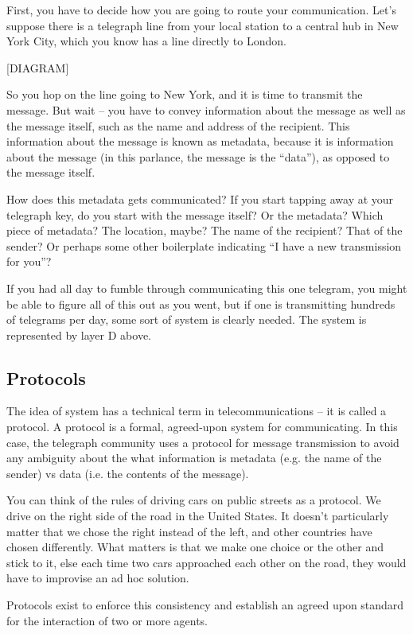 \documentclass{book}
\begin{document}
First, you have to decide how you are going to route your communication. Let's suppose there is a telegraph line from your local station to a central hub in New York City, which you know has a line directly to London.

[DIAGRAM]

So you hop on the line going to New York, and it is time to transmit the message. But wait – you have to convey information about the message as well as the message itself, such as the name and address of the recipient. This information about the message is known as metadata, because it is information about the message (in this parlance, the message is the “data”), as opposed to the message itself.

How does this metadata gets communicated? If you start tapping away at your telegraph key, do you start with the message itself? Or the metadata? Which piece of metadata? The location, maybe? The name of the recipient? That of the sender? Or perhaps some other boilerplate indicating “I have a new transmission for you”?

If you had all day to fumble through communicating this one telegram, you might be able to figure all of this out as you went, but if one is transmitting hundreds of telegrams per day, some sort of system is clearly needed. The system is represented by layer D above.

\subsection{Protocols}

The idea of system has a technical term in telecommunications – it is called a protocol. A protocol is a formal, agreed-upon system for communicating. In this case, the telegraph community uses a protocol for message transmission to avoid any ambiguity about the what information is metadata (e.g. the name of the sender) vs data (i.e. the contents of the message).

You can think of the rules of driving cars on public streets as a protocol. We drive on the right side of the road in the United States. It doesn't particularly matter that we chose the right instead of the left, and other countries have chosen differently. What matters is that we make one choice or the other and stick to it, else each time two cars approached each other on the road, they would have to improvise an ad hoc solution.

Protocols exist to enforce this consistency and establish an agreed upon standard for the interaction of two or more agents.
\end{document}
